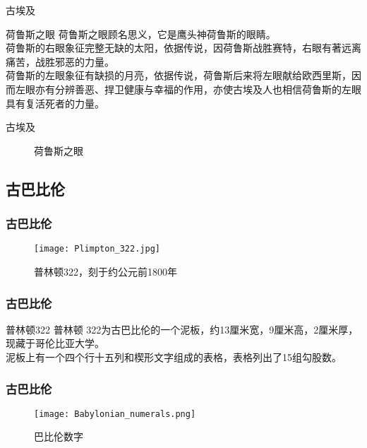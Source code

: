 \begin{frame}{古埃及}
	\begin{block}{荷鲁斯之眼}
		荷鲁斯之眼顾名思义，它是鹰头神荷鲁斯的眼睛。\\
		荷鲁斯的右眼象征完整无缺的太阳，依据传说，因荷鲁斯战胜赛特，右眼有著远离痛苦，战胜邪恶的力量。\\
		荷鲁斯的左眼象征有缺损的月亮，依据传说，荷鲁斯后来将左眼献给欧西里斯，因而左眼亦有分辨善恶、捍卫健康与幸福的作用，亦使古埃及人也相信荷鲁斯的左眼具有复活死者的力量。
	\end{block}
\end{frame}

\begin{frame}{古埃及}
	\begin{figure}\centering
		\caption{荷鲁斯之眼}
	\end{figure}
\end{frame}

\subsection{古巴比伦}

\begin{frame}\frametitle{古巴比伦}
	\begin{figure}\centering
		\texttt{[image: Plimpton\_322.jpg]}
		\caption{普林顿322，刻于约公元前1800年}
	\end{figure}
\end{frame}

\begin{frame}\frametitle{古巴比伦}
	\begin{block}{普林顿322}
		普林顿 322为古巴比伦的一个泥板，约13厘米宽，9厘米高，2厘米厚，现藏于哥伦比亚大学。\\
		泥板上有一个四个行十五列和楔形文字组成的表格，表格列出了15组勾股数。
	\end{block}
\end{frame}

\begin{frame}\frametitle{古巴比伦}
	\begin{figure}\centering
		\texttt{[image: Babylonian\_numerals.png]}
		\caption{巴比伦数字}
	\end{figure}
\end{frame}

